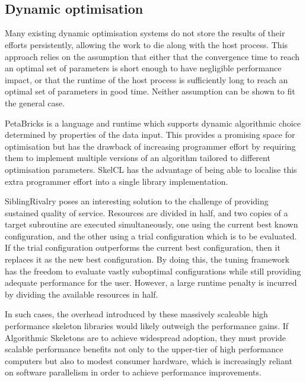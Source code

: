 ~\cite{Auler2014}

~\cite{Agakov}

\subsection{Dynamic optimisation}\label{subsec:dynamic-optimisation}

Many existing dynamic optimisation systems do not store the results of
their efforts persistently, allowing the work to die along with the
host process. This approach relies on the assumption that either that
the convergence time to reach an optimal set of parameters is short
enough to have negligible performance impact, or that the runtime of
the host process is sufficiently long to reach an optimal set of
parameters in good time. Neither assumption can be shown to fit the
general case.

PetaBricks is a language and runtime which supports dynamic
algorithmic choice determined by properties of the data input. This
provides a promising space for optimisation but has the drawback of
increasing programmer effort by requiring them to implement multiple
versions of an algorithm tailored to different optimisation
parameters. SkelCL has the advantage of being able to localise this
extra programmer effort into a single library implementation.

SiblingRivalry poses an interesting solution to the challenge of
providing sustained quality of service. Resources are divided in half,
and two copies of a target subroutine are executed simultaneously, one
using the current best known configuration, and the other using a
trial configuration which is to be evaluated. If the trial
configuration outperforms the current best configuration, then it
replaces it as the new best configuration. By doing this, the tuning
framework has the freedom to evaluate vastly suboptimal configurations
while still providing adequate performance for the user. However, a
large runtime penalty is incurred by dividing the available resources
in half.

In such cases, the overhead introduced by these massively scaleable
high performance skeleton libraries would likely outweigh the
performance gains. If Algorithmic Skeletons are to achieve widespread
adoption, they must provide scalable performance benefits not only to
the upper-tier of high performance computers but also to modest
consumer hardware, which is increasingly reliant on software
parallelism in order to achieve performance improvements.

